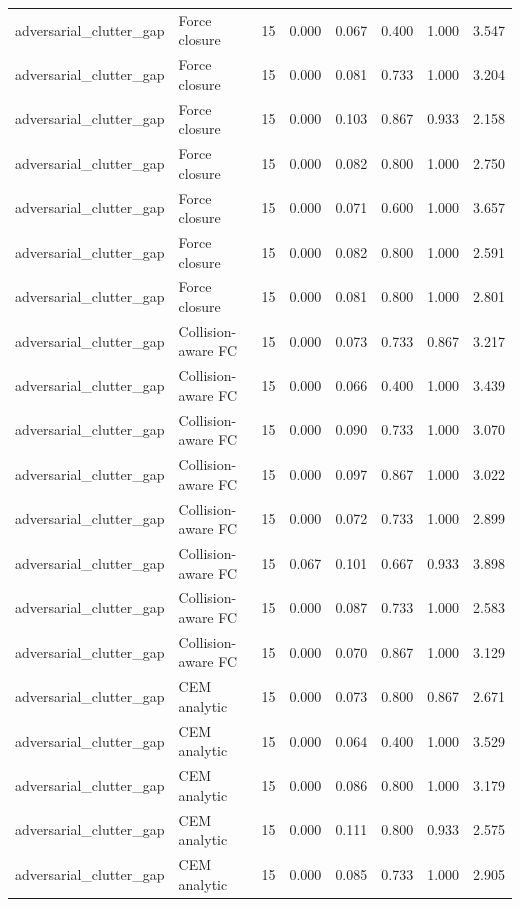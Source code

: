 {\begin{longtable}{llrrrrrr}
adversarial\_clutter\_gap & Force closure & 15 & 0.000 & 0.067 & 0.400 & 1.000 & 3.547 \\
adversarial\_clutter\_gap & Force closure & 15 & 0.000 & 0.081 & 0.733 & 1.000 & 3.204 \\
adversarial\_clutter\_gap & Force closure & 15 & 0.000 & 0.103 & 0.867 & 0.933 & 2.158 \\
adversarial\_clutter\_gap & Force closure & 15 & 0.000 & 0.082 & 0.800 & 1.000 & 2.750 \\
adversarial\_clutter\_gap & Force closure & 15 & 0.000 & 0.071 & 0.600 & 1.000 & 3.657 \\
adversarial\_clutter\_gap & Force closure & 15 & 0.000 & 0.082 & 0.800 & 1.000 & 2.591 \\
adversarial\_clutter\_gap & Force closure & 15 & 0.000 & 0.081 & 0.800 & 1.000 & 2.801 \\
adversarial\_clutter\_gap & Collision-aware FC & 15 & 0.000 & 0.073 & 0.733 & 0.867 & 3.217 \\
adversarial\_clutter\_gap & Collision-aware FC & 15 & 0.000 & 0.066 & 0.400 & 1.000 & 3.439 \\
adversarial\_clutter\_gap & Collision-aware FC & 15 & 0.000 & 0.090 & 0.733 & 1.000 & 3.070 \\
adversarial\_clutter\_gap & Collision-aware FC & 15 & 0.000 & 0.097 & 0.867 & 1.000 & 3.022 \\
adversarial\_clutter\_gap & Collision-aware FC & 15 & 0.000 & 0.072 & 0.733 & 1.000 & 2.899 \\
adversarial\_clutter\_gap & Collision-aware FC & 15 & 0.067 & 0.101 & 0.667 & 0.933 & 3.898 \\
adversarial\_clutter\_gap & Collision-aware FC & 15 & 0.000 & 0.087 & 0.733 & 1.000 & 2.583 \\
adversarial\_clutter\_gap & Collision-aware FC & 15 & 0.000 & 0.070 & 0.867 & 1.000 & 3.129 \\
adversarial\_clutter\_gap & CEM analytic & 15 & 0.000 & 0.073 & 0.800 & 0.867 & 2.671 \\
adversarial\_clutter\_gap & CEM analytic & 15 & 0.000 & 0.064 & 0.400 & 1.000 & 3.529 \\
adversarial\_clutter\_gap & CEM analytic & 15 & 0.000 & 0.086 & 0.800 & 1.000 & 3.179 \\
adversarial\_clutter\_gap & CEM analytic & 15 & 0.000 & 0.111 & 0.800 & 0.933 & 2.575 \\
adversarial\_clutter\_gap & CEM analytic & 15 & 0.000 & 0.085 & 0.733 & 1.000 & 2.905 \\

\end{longtable}}

